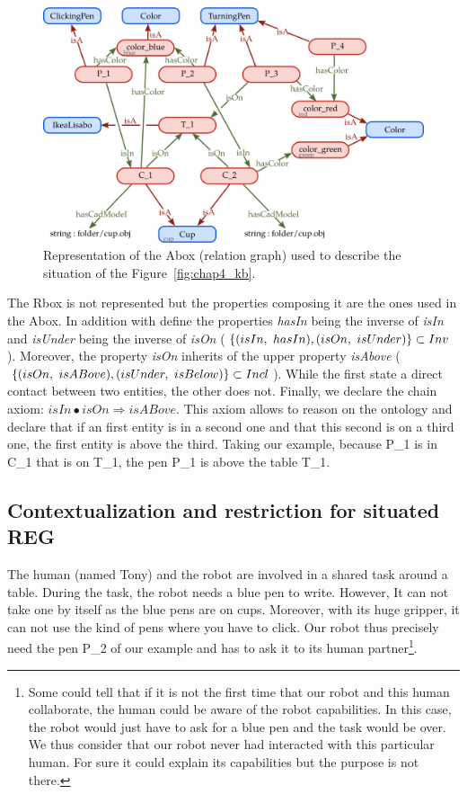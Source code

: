 \begin{figure}[h!]
\centering
\includegraphics[scale=0.38]{figures/chapter4/pens_Abox.png}
\caption{\label{fig:chap4_kb_Abox} Representation of the Abox (relation graph) used to describe the situation of the Figure~\ref{fig:chap4_kb}. }
\end{figure}

The Rbox is not represented but the properties composing it are the ones used in the Abox. In addition with define the properties \textit{hasIn} being the inverse of \textit{isIn} and \textit{isUnder} being the inverse of \textit{isOn} ($\{(isIn,\ hasIn), (isOn,\ isUnder)\} \subset \invset$). Moreover, the property \textit{isOn} inherits of the upper property \textit{isAbove} ($\{(isOn,\ isABove), (isUnder,\ isBelow)\} \subset Incl$). While the first state a direct contact between two entities, the other does not. Finally, we declare the chain axiom: $isIn \bullet isOn \Rightarrow isABove$. This axiom allows to reason on the ontology and declare that if an first entity is in a second one and that this second is on a third one, the first entity is above the third. Taking our example, because P\_1 is in C\_1 that is on T\_1, the pen P\_1 is above the table T\_1.


\subsection{Contextualization and restriction for situated REG}

The human (named Tony) and the robot are involved in a shared task around a table. During the task, the robot needs a blue pen to write. However, It can not take one by itself as the blue pens are on cups. Moreover, with its huge gripper, it can not use the kind of pens where you have to click. Our robot thus precisely need the pen P\_2 of our example and has to ask it to its human partner\footnote{Some could tell that if it is not the first time that our robot and this human collaborate, the human could be aware of the robot capabilities. In this case, the robot would just have to ask for a blue pen and the task would be over. We thus consider that our robot never had interacted with this particular human. For sure it could explain its capabilities but the purpose is not there.}.

